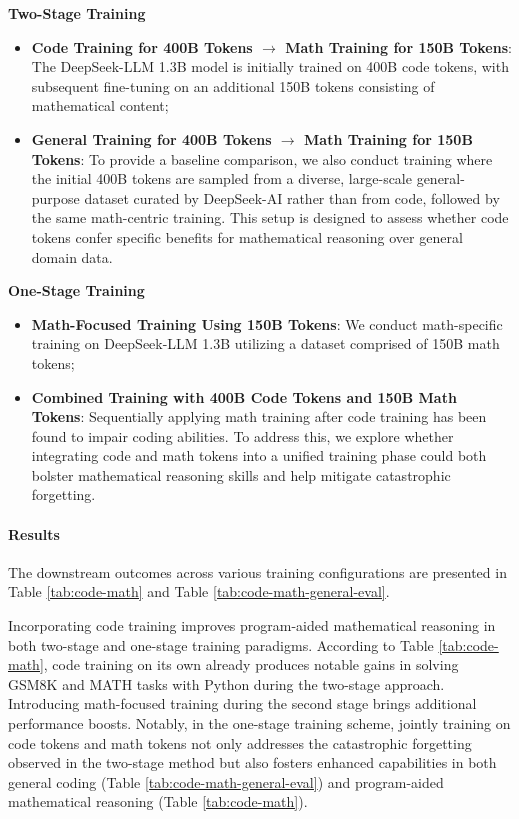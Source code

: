 \begin{itemize}[topsep=0pt]
\begin{itemize}[topsep=0pt]
\textbf{Two-Stage Training}

\begin{itemize}[topsep=0pt]
    \item \textbf{Code Training for 400B Tokens $\rightarrow$ Math Training for 150B Tokens}: The DeepSeek-LLM 1.3B model is initially trained on 400B code tokens, with subsequent fine-tuning on an additional 150B tokens consisting of mathematical content;
    \item \textbf{General Training for 400B Tokens $\rightarrow$ Math Training for 150B Tokens}: To provide a baseline comparison, we also conduct training where the initial 400B tokens are sampled from a diverse, large-scale general-purpose dataset curated by DeepSeek-AI rather than from code, followed by the same math-centric training. This setup is designed to assess whether code tokens confer specific benefits for mathematical reasoning over general domain data.
\end{itemize}

\textbf{One-Stage Training}

\begin{itemize}[topsep=0pt]
    \item \textbf{Math-Focused Training Using 150B Tokens}: We conduct math-specific training on DeepSeek-LLM 1.3B utilizing a dataset comprised of 150B math tokens;
    \item \textbf{Combined Training with 400B Code Tokens and 150B Math Tokens}: Sequentially applying math training after code training has been found to impair coding abilities. To address this, we explore whether integrating code and math tokens into a unified training phase could both bolster mathematical reasoning skills and help mitigate catastrophic forgetting.
\end{itemize}

\paragraph{Results}
The downstream outcomes across various training configurations are presented in Table \ref{tab:code-math} and Table \ref{tab:code-math-general-eval}.

Incorporating code training improves program-aided mathematical reasoning in both two-stage and one-stage training paradigms. According to Table \ref{tab:code-math}, code training on its own already produces notable gains in solving GSM8K and MATH tasks with Python during the two-stage approach. Introducing math-focused training during the second stage brings additional performance boosts. Notably, in the one-stage training scheme, jointly training on code tokens and math tokens not only addresses the catastrophic forgetting observed in the two-stage method but also fosters enhanced capabilities in both general coding (Table \ref{tab:code-math-general-eval}) and program-aided mathematical reasoning (Table \ref{tab:code-math}).


\end{itemize}
\end{itemize}
